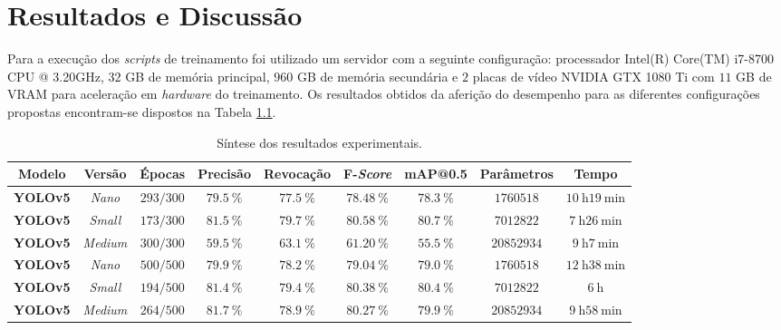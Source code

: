 
\chapter{Resultados e Discussão} \label{cap:resultados}

Para a execução dos \emph{scripts} de treinamento foi utilizado um servidor com a seguinte configuração: processador Intel(R) Core(TM) i7-8700 CPU @ 3.20GHz, $32$ GB de memória principal, $960$ GB de memória secundária e $2$ placas de vídeo NVIDIA GTX 1080 Ti com $11$ GB de VRAM para aceleração em \emph{hardware} do treinamento. Os resultados obtidos da aferição do desempenho para as diferentes configurações propostas encontram-se dispostos na Tabela \ref{tab:resultadosExperimentais}.


\begin{table}[h!]
\caption{Síntese dos resultados experimentais.} \label{tab:resultadosExperimentais}
\begin{footnotesize}
\begin{tabular}{ccccccccc}
\toprule
\textbf{Modelo} & \textbf{Versão} &\textbf{Épocas} &\textbf{Precisão} & \textbf{Revocação} & \textbf{F-\emph{Score}} & \textbf{mAP@0.5} & \textbf{Parâmetros} & \textbf{Tempo}\\
\midrule
\textbf{YOLOv5} & \emph{Nano} &  $293/300$ & $\SI{79,5}{\percent}$ & $\SI{77,5}{\percent}$ & $\SI{78,48}{\percent}$ & $\SI{78,3}{\percent}$ & $\num{1760518}$ & $\SI{10}{\hour}\SI{19}{\minute}$\\
\textbf{YOLOv5} & \emph{Small} & $173/300$ & $\SI{81,5}{\percent}$ & $\SI{79,7}{\percent}$ & $\SI{80,58}{\percent}$ & $\SI{80,7}{\percent}$ & $\num{7012822}$ & $\SI{7}{\hour}\SI{26}{\minute}$\\
\textbf{YOLOv5} & \emph{Medium} & $300/300$ & $\SI{59,5}{\percent}$ & $\SI{63,1}{\percent}$ & $\SI{61,20}{\percent}$ & $\SI{55,5}{\percent}$ & $\num{20852934}$ & $\SI{9}{\hour}\SI{7}{\minute}$\\
\midrule
\textbf{YOLOv5} & \emph{Nano} &  $500/500$ & $\SI{79,9}{\percent}$ & $\SI{78,2}{\percent}$ & $\SI{79,04}{\percent}$ & $\SI{79,0}{\percent}$ & $\num{1760518}$ & $\SI{12}{\hour}\SI{38}{\minute}$\\
\textbf{YOLOv5} &\emph{Small} &  $194/500$ & $\SI{81,4}{\percent}$ & $\SI{79,4}{\percent}$ & $\SI{80,38}{\percent}$ & $\SI{80,4}{\percent}$ & $\num{7012822}$ & $\SI{6}{\hour}$\\
\textbf{YOLOv5} & \emph{Medium} & $264/500$ & $\SI{81,7}{\percent}$ & $\SI{78,9}{\percent}$ & $\SI{80,27}{\percent}$ & $\SI{79,9}{\percent}$ & $\num{20852934}$ & $\SI{9}{\hour}\SI{58}{\minute}$\\

\end{tabular}
\end{footnotesize}
\end{table}
